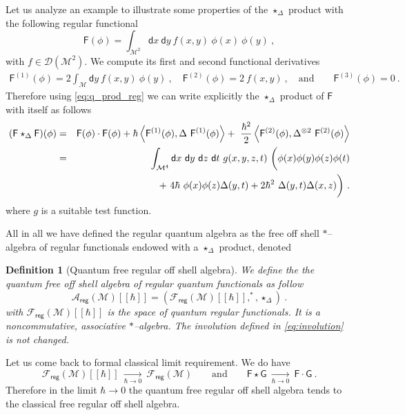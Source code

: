 \documentclass[11pt]{book}
\newcommand{\reg}{\mathsf{reg}}
\newcommand{\sm}[1]{\left\langle#1\right\rangle}
\newcommand{\Acal}{\mathcal{A}}
\newcommand{\Dcal}{\mathcal{D}}
\newcommand{\Fcal}{\mathcal{F}}
\newcommand{\Mcal}{\mathcal{M}}
\newcommand{\Fsf}{\mathsf{F}}
\newcommand{\Gsf}{\mathsf{G}}
\newcommand{\dsf}{\mathsf{d}}
\theoremstyle{break}
\newtheorem{definition}{Definition}[chapter]
\begin{document}
Let us analyze an example to illustrate some properties of the $\star_\Delta$ product with the following regular functional
%
\begin{equation*}
\Fsf(\phi) = \int_{\Mcal^2} \dsf x \ \dsf y \ f(x,y) \ \phi(x) \ \phi(y) \ ,
\end{equation*}
%
with $f \in \Dcal(\Mcal^2)$. We compute its first and second functional derivatives
%
\begin{eqnarray*}
\Fsf^{(1)}(\phi) = 2 \int_\Mcal \dsf y \ f(x,y) \ \phi(y) \ , 
\quad 
\Fsf^{(2)}(\phi) = 2 \ f(x,y) \ , 
\quad \mbox{and} \qquad 
\Fsf^{(3)}(\phi) = 0 \ .
\end{eqnarray*}
%
Therefore using \eqref{eq:q_prod_reg} we can write explicitly the $\star_\Delta$ product of $\Fsf$ with itself as follows
%
\begin{eqnarray*}
(\Fsf \star_\Delta \Fsf)(\phi) &=& \Fsf(\phi) \cdot \Fsf(\phi) + \hbar \sm{ \Fsf^{(1)}(\phi) , \Delta \ \Fsf^{(1)}(\phi) } + \ \frac{\hbar^2}{2} \sm{ \Fsf^{(2)}(\phi) , \Delta^{\otimes 2} \ \Fsf^{(2)}(\phi)} \\
%
&=& \int_{\Mcal^4} \dsf x \ \dsf y \ \dsf z \ \dsf t \ g(x,y,z,t) \ \bigg( \phi(x) \phi(y) \phi(z) \phi(t) \\
&& \hspace*{60pt} + \ 4 \hbar \ \phi(x) \phi(z) \Delta(y,t) + 2 \hbar^2 \ \Delta(y,t) \Delta(x,z) \bigg) \ .
\end{eqnarray*}
%
where $g$ is a suitable test function. 


\bigskip


All in all we have defined the regular quantum algebra as the free off shell $\ast$--algebra of regular functionals endowed with a $\star_\Delta$ product, denoted


\begin{definition}[Quantum free regular off shell algebra]\label{def:alg_q_reg}
We define the the quantum free off shell algebra of regular quantum functionals as follow
%
\begin{equation*}
\Acal_\reg(\Mcal)[[\hbar]] = \left(\Fcal_\reg(\Mcal)[[\hbar]] , ^\ast , \star_{\Delta} \right) \ . 
\end{equation*}
%
with $\Fcal_\reg(\Mcal)[[\hbar]]$ is the space of quantum regular functionals. It is a noncommutative, associative $\ast$--algebra. The involution defined in \eqref{eq:involution} is not changed.
\end{definition}


Let us come back to formal classical limit requirement. We do have
%
\begin{equation*}
\Fcal_\reg(\Mcal)[[\hbar]] \ \underset{\hbar \to 0}{\longrightarrow} \ \Fcal_\reg(\Mcal)\qquad \mbox{and} \qquad \Fsf \star \Gsf \ \underset{\hbar \to 0}{\longrightarrow} \ \Fsf \cdot \Gsf \ . 
\end{equation*}
%
Therefore in the limit $\hbar \to 0$ the quantum free regular off shell algebra tends to the classical free regular off shell algebra.
\end{document}
